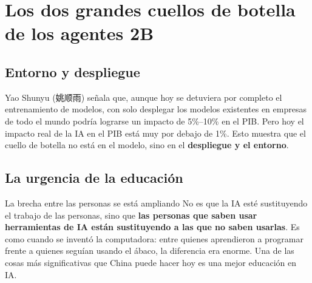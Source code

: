 \section{Los dos grandes cuellos de botella de los agentes 2B}

\subsection{Entorno y despliegue}

Yao Shunyu (姚顺雨) señala que, aunque hoy se detuviera por completo el entrenamiento de modelos, con solo desplegar los modelos existentes en empresas de todo el mundo podría lograrse un impacto de 5\%--10\% en el PIB. Pero hoy el impacto real de la IA en el PIB está muy por debajo de 1\%. Esto muestra que el cuello de botella no está en el modelo, sino en el \textbf{despliegue y el entorno}.

\subsection{La urgencia de la educación}

\begin{importantbox}{La brecha entre las personas se está ampliando}
No es que la IA esté sustituyendo el trabajo de las personas, sino que \textbf{las personas que saben usar herramientas de IA están sustituyendo a las que no saben usarlas}. Es como cuando se inventó la computadora: entre quienes aprendieron a programar frente a quienes seguían usando el ábaco, la diferencia era enorme. Una de las cosas más significativas que China puede hacer hoy es una mejor educación en IA.
\end{importantbox}


